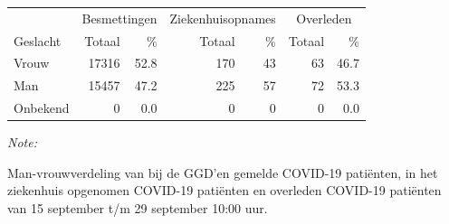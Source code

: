 \documentclass[
  english,
  man,floatsintext]{apa6}
\begin{document}
\begin{table}[H]
\centering\begingroup\fontsize{11}{13}\selectfont

\begin{threeparttable}
\begin{tabular}{lrrrrrr}
\toprule
\multicolumn{1}{c}{ } & \multicolumn{2}{c}{Besmettingen} & \multicolumn{2}{c}{Ziekenhuisopnames} & \multicolumn{2}{c}{Overleden} \\
\cmidrule(l{3pt}r{3pt}){2-3} \cmidrule(l{3pt}r{3pt}){4-5} \cmidrule(l{3pt}r{3pt}){6-7}
Geslacht & Totaal & \% & Totaal & \% & Totaal & \%\\
\midrule
Vrouw & 17316 & 52.8 & 170 & 43 & 63 & 46.7\\
Man & 15457 & 47.2 & 225 & 57 & 72 & 53.3\\
Onbekend & 0 & 0.0 & 0 & 0 & 0 & 0.0\\
\bottomrule
\end{tabular}
\begin{tablenotes}
\item \textit{Note: } 
\item Man-vrouwverdeling van bij de GGD’en gemelde COVID-19 patiënten, in het ziekenhuis opgenomen COVID-19 patiënten en overleden COVID-19 patiënten van 15 september t/m 29 september 10:00 uur.
\end{tablenotes}
\end{threeparttable}
\endgroup{}
\end{table}
\newpage
\end{document}
